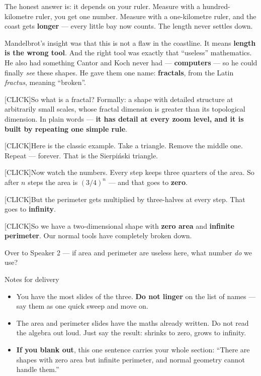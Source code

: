 \documentclass[12pt,a4paper]{article}
\newcommand{\cue}{\textcolor{RayColor}{\textsf{\footnotesize[CLICK]}}\hspace{0.3em}}
\newcommand{\stress}[1]{\textbf{#1}}
\begin{document}
The honest answer is: it depends on your ruler. Measure with a hundred-kilometre
ruler, you get one number. Measure with a one-kilometre ruler, and the coast gets
\stress{longer} --- every little bay now counts. The length never settles down.

Mandelbrot's insight was that this is not a flaw in the coastline. It means
\stress{length is the wrong tool}. And the right tool was exactly that ``useless''
mathematics. He also had something Cantor and Koch never had --- \stress{computers}
--- so he could finally \emph{see} these shapes. He gave them one name:
\stress{fractals}, from the Latin \emph{fractus}, meaning ``broken''.

\cue So what is a fractal? Formally: a shape with detailed structure at
arbitrarily small scales, whose fractal dimension is greater than its topological
dimension. In plain words --- \stress{it has detail at every zoom level, and it is
built by repeating one simple rule}.

\cue Here is the classic example. Take a triangle. Remove the middle one.
Repeat --- forever. That is the Sierpi\'nski triangle.

\cue Now watch the numbers. Every step keeps three quarters of the area. So after
$n$ steps the area is $(3/4)^n$ --- and that goes to \stress{zero}.

\cue But the perimeter gets multiplied by three-halves at every step. That goes to
\stress{infinity}.

\cue So we have a two-dimensional shape with \stress{zero area} and
\stress{infinite perimeter}. Our normal tools have completely broken down.

Over to Speaker 2 --- if area and perimeter are useless here, what number
\emph{do} we use?

\begin{notebox}{Notes for delivery}
  \begin{itemize}[leftmargin=1.2em, itemsep=2pt, topsep=2pt]
    \item You have the most slides of the three. \stress{Do not linger} on the
      list of names --- say them as one quick sweep and move on.
    \item The area and perimeter slides have the maths already written. Do not read
      the algebra out loud. Just say the result: shrinks to zero, grows to infinity.
    \item \stress{If you blank out}, this one sentence carries your whole section:
      ``There are shapes with zero area but infinite perimeter, and normal geometry
      cannot handle them.''
  \end{itemize}
\end{notebox}
\end{document}
